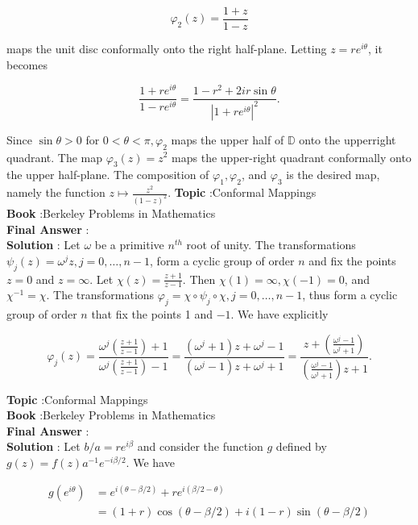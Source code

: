 \documentclass[10pt]{article}
\begin{document}
$$
\varphi_{2}(z)=\frac{1+z}{1-z}
$$

maps the unit disc conformally onto the right half-plane. Letting $z=r e^{i \theta}$, it becomes

$$
\frac{1+r e^{i \theta}}{1-r e^{i \theta}}=\frac{1-r^{2}+2 i r \sin \theta}{\left|1+r e^{i \theta}\right|^{2}} .
$$

Since $\sin \theta>0$ for $0<\theta<\pi, \varphi_{2}$ maps the upper half of $\mathbb{D}$ onto the upperright quadrant. The map $\varphi_{3}(z)=z^{2}$ maps the upper-right quadrant conformally onto the upper half-plane. The composition of $\varphi_{1}, \varphi_{2}$, and $\varphi_{3}$ is the desired map, namely the function $z \mapsto \frac{z^{2}}{(1-z)^{2}}$.
\textbf{Topic} :Conformal Mappings \\
\textbf{Book} :Berkeley Problems in Mathematics\\
\textbf{Final Answer} :\\


\textbf{Solution} : Let $\omega$ be a primitive $n^{t h}$ root of unity. The transformations $\psi_{j}(z)=\omega^{j} z, j=0, \ldots, n-1$, form a cyclic group of order $n$ and fix the points $z=0$ and $z=\infty$. Let $\chi(z)=\frac{z+1}{z-1}$. Then $\chi(1)=\infty, \chi(-1)=0$, and $\chi^{-1}=\chi$. The transformations $\varphi_{j}=\chi \circ \psi_{j} \circ \chi, j=0, \ldots, n-1$, thus form a cyclic group of order $n$ that fix the points 1 and $-1$. We have explicitly

$$
\varphi_{j}(z)=\frac{\omega^{j}\left(\frac{z+1}{z-1}\right)+1}{\omega^{j}\left(\frac{z+1}{z-1}\right)-1}=\frac{\left(\omega^{j}+1\right) z+\omega^{j}-1}{\left(\omega^{j}-1\right) z+\omega^{j}+1}=\frac{z+\left(\frac{\omega^{j}-1}{\omega^{j}+1}\right)}{\left(\frac{\omega^{j}-1}{\omega^{j}+1}\right) z+1} .
$$




\textbf{Topic} :Conformal Mappings \\
\textbf{Book} :Berkeley Problems in Mathematics\\
\textbf{Final Answer} :\\


\textbf{Solution} : Let $b / a=r e^{i \beta}$ and consider the function $g$ defined by $g(z)=f(z) a^{-1} e^{-i \beta / 2}$. We have

$$
\begin{aligned}
g\left(e^{i \theta}\right) &=e^{i(\theta-\beta / 2)}+r e^{i(\beta / 2-\theta)} \\
&=(1+r) \cos (\theta-\beta / 2)+i(1-r) \sin (\theta-\beta / 2)
\end{aligned}
$$
\end{document}
